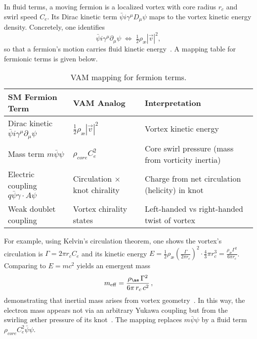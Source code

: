 \documentclass[a4paper,12pt]{article}
\begin{document}
In fluid terms, a moving fermion is a localized vortex with core radius $r_c$ and swirl speed $C_e$. Its Dirac kinetic term $\bar{\psi} i\gamma^\mu D_\mu \psi$ maps to the vortex kinetic energy density. Concretely, one identifies
\begin{equation}
    \bar{\psi} i\gamma^\mu \partial_\mu \psi \;\Longleftrightarrow\; \tfrac{1}{2}\rho_{æ}|\vec{v}|^2,
\end{equation}
so that a fermion's motion carries fluid kinetic energy~\cite{vam-lagrangian}. A mapping table for fermionic terms is given below.

\begin{table}[H]
    \centering
    \begin{tabular}{lll}
        \toprule
        \textbf{SM Fermion Term} & \textbf{VAM Analog} & \textbf{Interpretation} \\
        \midrule
        Dirac kinetic $\bar{\psi} i\gamma^\mu\partial_\mu\psi$ & $\tfrac{1}{2}\rho_{æ}|\vec{v}|^2$ & Vortex kinetic energy \\
        Mass term $m\bar{\psi}\psi$ & $\rho_{core}C_e^2$ & Core swirl pressure (mass from vorticity inertia) \\
        Electric coupling $q\bar{\psi}\gamma\cdot A\psi$ & Circulation $\times$ knot chirality & Charge from net circulation (helicity) in knot \\
        Weak doublet coupling & Vortex chirality states & Left-handed vs right-handed twist of vortex \\
        \bottomrule
    \end{tabular}
    \caption{VAM mapping for fermion terms.}
    \label{tab:fermion-map}
\end{table}

For example, using Kelvin's circulation theorem, one shows the vortex's circulation is $\Gamma=2\pi r_c C_e$ and its kinetic energy $E=\frac{1}{2}\rho_{æ}\left(\frac{\Gamma}{2\pi r_c}\right)^2\cdot\frac{4}{3}\pi r_c^3 = \frac{\rho_{æ}\Gamma^2}{6\pi r_c}$. Comparing to $E=mc^2$ yields an emergent mass
\begin{equation}
    m_{\rm eff} = \frac{\rho_{æ}\,\Gamma^2}{6\pi\,r_c\,c^2}\,,
\end{equation}
demonstrating that inertial mass arises from vortex geometry~\cite{vam-lagrangian}. In this way, the electron mass appears not via an arbitrary Yukawa coupling but from the swirling æther pressure of its knot~\cite{vam-lagrangian}. The mapping replaces $m\bar{\psi}\psi$ by a fluid term $\rho_{core}C_e^2\bar{\psi}\psi$.
\end{document}
